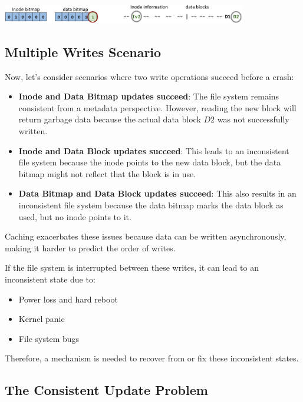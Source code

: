 \documentclass[../../compsys.tex]{subfiles}
\begin{document}
\begin{center}
  \includegraphics[width=0.8\textwidth]{chapters/L7/images/single-write.png}
\end{center}

\subsection{Multiple Writes Scenario}

Now, let's consider scenarios where two write operations succeed before a crash:

\begin{itemize}
    \item \textbf{Inode and Data Bitmap updates succeed}: The file system remains consistent from a metadata perspective. However, reading the new block will return garbage data because the actual data block \( D2 \) was not successfully written.
    \item \textbf{Inode and Data Block updates succeed}: This leads to an inconsistent file system because the inode points to the new data block, but the data bitmap might not reflect that the block is in use.
    \item \textbf{Data Bitmap and Data Block updates succeed}: This also results in an inconsistent file system because the data bitmap marks the data block as used, but no inode points to it.
\end{itemize}

Caching exacerbates these issues because data can be written asynchronously, making it harder to predict the order of writes.

If the file system is interrupted between these writes, it can lead to an inconsistent state due to:

\begin{itemize}
    \item Power loss and hard reboot
    \item Kernel panic
    \item File system bugs
\end{itemize}

Therefore, a mechanism is needed to recover from or fix these inconsistent states.
\newpage
\subsection{The Consistent Update Problem}
\end{document}
